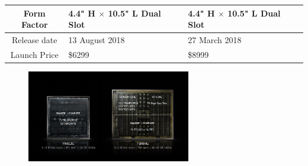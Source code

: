 \documentclass[xcolor=x11names,table]{beamer}
\begin{document}
\begin{frame}[allowframebreaks]
\begin{longtable}{c | l | l}
                \\ \hline
            Form Factor & \makecell{4.4" H $\times$ 10.5" L\\ Dual Slot} & \makecell{4.4" H $\times$ 10.5" L \\Dual Slot}
                \\ \hline
            Release date & 13 August 2018 & 27 March 2018
                \\ \hline
            Launch Price & \$6299 & \$8999
        \end{longtable}
    \end{frame}

    \begin{frame}
        \begin{figure}[H]
            \includegraphics[width=270px]{refs/NVIDIA-RTX-Turing-GPU_19-1}
        \end{figure}
    \end{frame}
\end{document}
